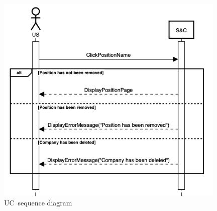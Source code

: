 \begin{figure}[h]
    \centering
    \includegraphics[width=11cm]{images/sequence-diagrams/student-views-position.png}
    \caption{UC\theuc\ sequence diagram}
\end{figure}


